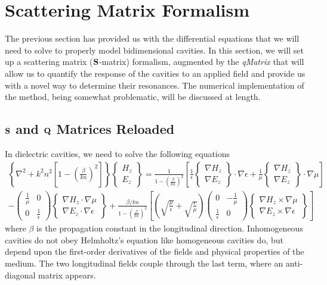 \section{Scattering Matrix Formalism}
The previous section has provided us with the differential equations that 
we will need to solve to properly model bidimensional cavities. In this section, 
we will set up a scattering matrix ($\mathbf{S}$-matrix) formalism, augmented by the \textit{\gls{qMatrix}}
that will allow us to quantify the response of the cavities
to an applied field and provide us with a novel way to determine their resonances. 
The numerical implementation of the method, being somewhat problematic, will 
be discussed at length. 

\subsection{$\mathbf{S}$ and $\mathbf{Q}$ Matrices Reloaded}
In dielectric cavities, we need to solve the following equations
  \begin{multline}
    \left\{\nabla^2+k^2n^2\left[1-\left(\frac{\beta}{kn}\right)^2\right]\right\}\begin{Bmatrix} H_z \\ E_z \end{Bmatrix}
      = \frac{1}{1-\left(\frac{\beta}{kn}\right)^2}
	  \left[\frac{1}{\epsilon}\begin{Bmatrix} \nabla H_z \\ \nabla E_z \end{Bmatrix}\cdot\nabla\epsilon+\frac{1}{\mu}\begin{Bmatrix} \nabla  H_z \\ \nabla E_z \end{Bmatrix}\cdot\nabla\mu\right]
      \\-\begin{pmatrix} \frac{1}{\mu} & 0 \\ 0 &\frac{1}{\epsilon}\end{pmatrix} \begin{Bmatrix} \nabla H_z \cdot\nabla\mu \\ \nabla E_z\cdot\nabla\epsilon \end{Bmatrix}
      +\frac{\beta/kn}{1-\left(\frac{\beta}{kn}\right)^2}\left[\left(\sqrt{\frac{\mu}{\epsilon}}+\sqrt{\frac{\epsilon}{\mu}}\right)\begin{pmatrix}0 & -\frac{1}{\mu}\\\frac{1}{\epsilon} & 0\end{pmatrix}
      \begin{Bmatrix} \nabla H_z\times\nabla\mu \\ \nabla E_z\times\nabla\epsilon\end{Bmatrix}\right]
  \end{multline}
where $\beta$ is the propagation constant in the longitudinal direction.
Inhomogeneous cavities do not obey Helmholtz's equation like homogeneous
cavities do, but depend upon the first-order derivatives of the fields and 
physical properties of the medium. The two longitudinal fields
couple through the last term, where an anti-diagonal matrix appears.

